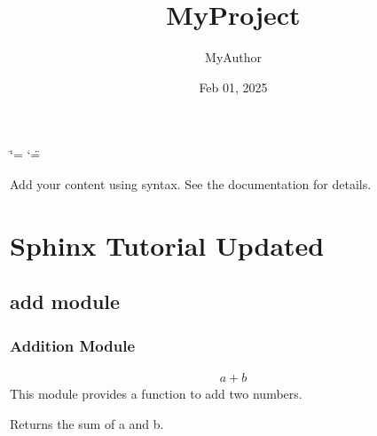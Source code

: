 \documentclass[a4paper,14pt,oneside,english,openany]{sphinxmanual}
\title{MyProject}
\date{Feb 01, 2025}
\author{MyAuthor}
\begin{document}
\ifdefined\shorthandoff
  \ifnum\catcode`\=\string=\active\shorthandoff{=}\fi
  \ifnum\catcode`\"=\active{}\fi
\fi

\pagestyle{empty}
\sphinxmaketitle
\pagestyle{plain}
\sphinxtableofcontents
\pagestyle{normal}
\label{\detokenize{index::doc}}


\sphinxAtStartPar
Add your content using  syntax. See the
documentation for details.

\sphinxstepscope


\chapter{Sphinx Tutorial Updated}
\label{\detokenize{modules:sphinx-tutorial-updated}}\label{\detokenize{modules::doc}}
\sphinxstepscope


\section{add module}
\label{\detokenize{add:module-add}}\label{\detokenize{add:add-module}}\label{\detokenize{add::doc}}

\subsection{Addition Module}
\label{\detokenize{add:addition-module}}\begin{equation*}
\begin{split}a + b\end{split}
\end{equation*}
\sphinxAtStartPar
This module provides a function to add two numbers.

\begin{fulllineitems}
\label{\detokenize{add:add.add}}
\pysigstartsignatures
{}
\pysigstopsignatures
\sphinxAtStartPar
Returns the sum of a and b.

\end{fulllineitems}


\sphinxstepscope
\end{document}
